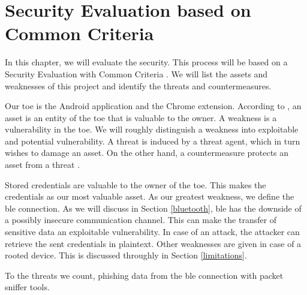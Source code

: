 \section{Security Evaluation based on Common Criteria} \label{seceval}
In this chapter, we will evaluate the security. This process will be based on a Security Evaluation with Common Criteria \cite{CC}. We will list the assets and weaknesses of this project and identify the threats and countermeasures.

Our \gls{toe} is the Android application and the Chrome extension. According to \cite{CC}, an asset is an entity of the \gls{toe} that is valuable to the owner. A weakness is a vulnerability in the \gls{toe}. We will roughly distinguish a weakness into exploitable and potential vulnerability.
A threat is induced by a threat agent, which in turn wishes to damage an asset. On the other hand, a countermeasure protects an asset from a threat \cite{CC}.

Stored credentials are valuable to the owner of the \gls{toe}. This makes the credentials as our most valuable asset. 
As our greatest weakness, we define the \gls{ble} connection. As we will discuss in Section \ref{bluetooth}, \gls{ble} has the downside of a possibly insecure communication channel. This can make the transfer of sensitive data an exploitable vulnerability. In case of an attack, the attacker can retrieve the sent credentials in plaintext. Other weaknesses are given in case of a rooted device. This is discussed throughly in Section \ref{limitations}.

To the threats we count, phishing data from the \gls{ble} connection with packet sniffer tools.  







